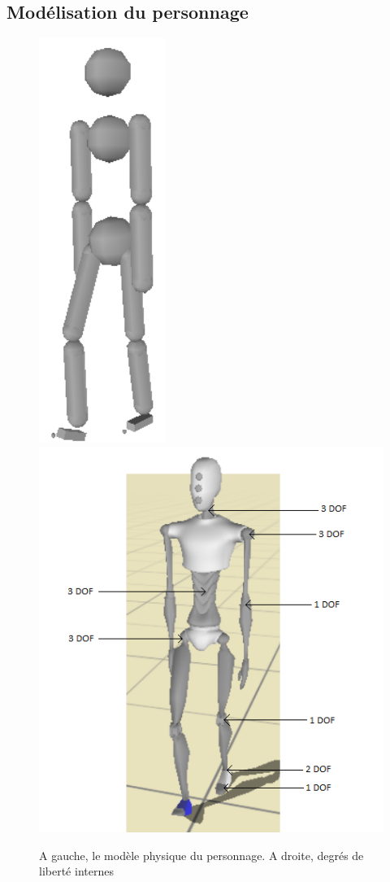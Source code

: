 \documentclass[runningheads,a4paper]{llncs}
\begin{document}
\subsection{Modélisation du personnage}
%
\vspace*{-0.5cm}
\begin{figure}[h]
\centering
\includegraphics[scale=0.35]{colli_primitives.png}
\includegraphics[scale=0.35]{img_dof.png}
\caption{A gauche, le modèle physique du personnage. A droite, degrés de liberté internes}
\label{fig:colli_primitives}
\label{fig:dof}
\end{figure}
\end{document}
